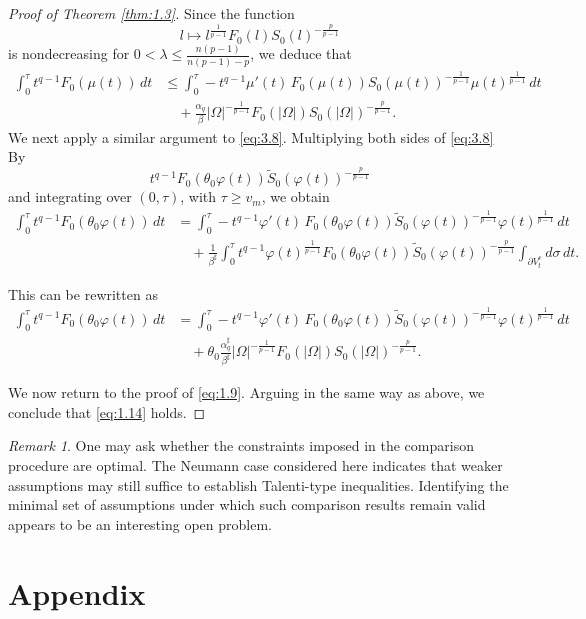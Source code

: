 \documentclass[11pt]{article}
\numberwithin{equation}{section}
\theoremstyle{definition}
\theoremstyle{remark}
\newtheorem{remark}[theorem]{Remark}
\begin{document}
\begin{proof}[Proof of Theorem \ref{thm:1.3}]
Since the function
\[
l \mapsto l^{\frac{1}{p-1}} F_0(l) S_0(l)^{-\frac{p}{p-1}}
\]
is nondecreasing for
$0 < \lambda \le \frac{n(p-1)}{n(p-1)-p}$,
we deduce that
\begin{align*}
\int_0^\tau t^{q-1} F_0(\mu(t))\,dt
&\le
\int_0^\tau -t^{q-1}\mu'(t)\, F_0(\mu(t)) S_0(\mu(t))^{-\frac{1}{p-1}}
\mu(t)^{\frac{1}{p-1}}\,dt \\
&\quad +
\frac{\alpha_q}{\beta}
|\Omega|^{-\frac{1}{p-1}}
F_0(|\Omega|)
S_0(|\Omega|)^{-\frac{p}{p-1}}.
\end{align*}
We next apply a similar argument to \eqref{eq:3.8}. Multiplying both sides of \eqref{eq:3.8} By
\[
t^{q-1} F_0(\theta_0 \varphi(t)) \tilde{S}_0(\varphi(t))^{-\frac{p}{p-1}}
\]
and integrating over $(0,\tau)$, with $\tau \ge v_m$, we obtain
\begin{align*}
\int_0^\tau t^{q-1} F_0(\theta_0\varphi(t))\,dt
&=
\int_0^\tau -t^{q-1}\varphi'(t)\,F_0(\theta_0\varphi(t))
\tilde{S}_0(\varphi(t))^{-\frac{1}{p-1}}
\varphi(t)^{\frac{1}{p-1}}\,dt \\
&\quad +
\frac{1}{\beta^\sharp}
\int_0^\tau t^{q-1}\varphi(t)^{\frac{1}{p-1}}
F_0(\theta_0\varphi(t))
\tilde{S}_0(\varphi(t))^{-\frac{p}{p-1}}
\int_{\partial V_t^e} d\sigma\,dt.
\end{align*}

This can be rewritten as
\begin{align*}
\int_0^\tau t^{q-1} F_0(\theta_0\varphi(t))\,dt
&=
\int_0^\tau -t^{q-1}\varphi'(t)\,F_0(\theta_0\varphi(t))
\tilde{S}_0(\varphi(t))^{-\frac{1}{p-1}}
\varphi(t)^{\frac{1}{p-1}}\,dt \\
&\quad +
\theta_0
\frac{\alpha_q^\sharp}{\beta^\sharp}
|\Omega|^{-\frac{1}{p-1}}
F_0(|\Omega|)
S_0(|\Omega|)^{-\frac{p}{p-1}}.
\end{align*}

We now return to the proof of \eqref{eq:1.9}. Arguing in the same way as above, we conclude that \eqref{eq:1.14} holds.
\end{proof}
\begin{remark}
 One may ask whether the constraints imposed in the comparison procedure are optimal. 
The Neumann case considered here indicates that weaker assumptions may still suffice to establish Talenti-type inequalities. 
Identifying the minimal set of assumptions under which such comparison results remain valid appears to be an interesting open problem.
\end{remark}

\appendix
\section*{Appendix}
\end{document}
